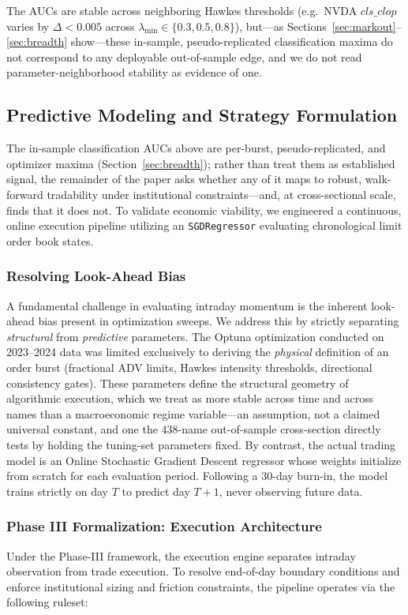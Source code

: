 \documentclass[11pt]{article}
\begin{document}
The AUCs are stable across neighboring Hawkes thresholds (e.g.\ NVDA $cls\_clop$ varies by $\Delta<0.005$ across $\lambda_{\min}\in\{0.3,0.5,0.8\}$), but---as Sections~\ref{sec:markout}--\ref{sec:breadth} show---these in-sample, pseudo-replicated classification maxima do not correspond to any deployable out-of-sample edge, and we do not read parameter-neighborhood stability as evidence of one.

\subsection{Predictive Modeling and Strategy Formulation}
The in-sample classification AUCs above are per-burst, pseudo-replicated, and optimizer maxima (Section~\ref{sec:breadth}); rather than treat them as established signal, the remainder of the paper asks whether any of it maps to robust, walk-forward tradability under institutional constraints---and, at cross-sectional scale, finds that it does not. To validate economic viability, we engineered a continuous, online execution pipeline utilizing an \texttt{SGDRegressor} evaluating chronological limit order book states.

\subsubsection{Resolving Look-Ahead Bias}
A fundamental challenge in evaluating intraday momentum is the inherent look-ahead bias present in optimization sweeps. We address this by strictly separating \textit{structural} from \textit{predictive} parameters. The Optuna optimization conducted on 2023--2024 data was limited exclusively to deriving the \textit{physical} definition of an order burst (fractional ADV limits, Hawkes intensity thresholds, directional consistency gates). These parameters define the structural geometry of algorithmic execution, which we treat as more stable across time and across names than a macroeconomic regime variable---an assumption, not a claimed universal constant, and one the 438-name out-of-sample cross-section directly tests by holding the tuning-set parameters fixed. By contrast, the actual trading model is an Online Stochastic Gradient Descent regressor whose weights initialize from scratch for each evaluation period. Following a 30-day burn-in, the model trains strictly on day $T$ to predict day $T+1$, never observing future data.

\subsubsection{Phase III Formalization: Execution Architecture}
\label{sec:phase3}
Under the Phase-III framework, the execution engine separates intraday observation from trade execution. To resolve end-of-day boundary conditions and enforce institutional sizing and friction constraints, the pipeline operates via the following ruleset:
\end{document}
